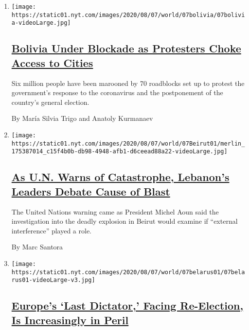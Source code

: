 \begin{enumerate}
\def\labelenumi{\arabic{enumi}.}
\item
  \texttt{[image: https://static01.nyt.com/images/2020/08/07/world/07bolivia/07bolivia-videoLarge.jpg]}

  \hypertarget{bolivia-under-blockade-as-protesters-choke-access-to-cities}{%
  \subsection{\texorpdfstring{\href{/2020/08/07/world/americas/bolivia-roadblock-blockade.html}{Bolivia
  Under Blockade as Protesters Choke Access to
  Cities}}{Bolivia Under Blockade as Protesters Choke Access to Cities}}\label{bolivia-under-blockade-as-protesters-choke-access-to-cities}}

  Six million people have been marooned by 70 roadblocks set up to
  protest the government's response to the coronavirus and the
  postponement of the country's general election.

  By María Silvia Trigo and Anatoly Kurmanaev
\item
  \texttt{[image: https://static01.nyt.com/images/2020/08/07/world/07Beirut01/merlin\_175387014\_c15f4b0b-db98-4948-afb1-d6ceead88a22-videoLarge.jpg]}

  \hypertarget{as-un-warns-of-catastrophe-lebanons-leaders-debate-cause-of-blast}{%
  \subsection{\texorpdfstring{\href{/2020/08/07/world/europe/lebanon-catastrophe-explosion-external-interference.html}{As
  U.N. Warns of Catastrophe, Lebanon's Leaders Debate Cause of
  Blast}}{As U.N. Warns of Catastrophe, Lebanon's Leaders Debate Cause of Blast}}\label{as-un-warns-of-catastrophe-lebanons-leaders-debate-cause-of-blast}}

  The United Nations warning came as President Michel Aoun said the
  investigation into the deadly explosion in Beirut would examine if
  ``external interference'' played a role.

  By Marc Santora
\item
  \texttt{[image: https://static01.nyt.com/images/2020/08/07/world/07belarus01/07belarus01-videoLarge-v3.jpg]}

  \hypertarget{europes-last-dictator-facing-re-election-is-increasingly-in-peril}{%
  \subsection{\texorpdfstring{\href{/2020/08/07/world/europe/belarus-election-aleksandr-lukashenko.html}{Europe's
  `Last Dictator,' Facing Re-Election, Is Increasingly in
  Peril}}{Europe's `Last Dictator,' Facing Re-Election, Is Increasingly in Peril}}\label{europes-last-dictator-facing-re-election-is-increasingly-in-peril}}


\end{enumerate}
